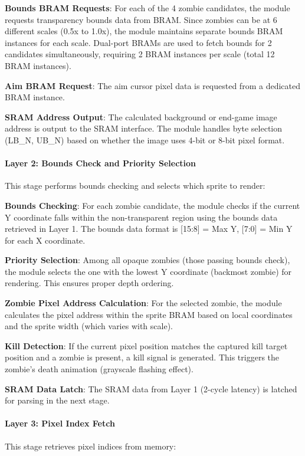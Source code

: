 \documentclass[12pt,a4paper]{article}
\begin{document}
\textbf{Bounds BRAM Requests}: For each of the 4 zombie candidates, the module requests transparency bounds data from BRAM. Since zombies can be at 6 different scales (0.5x to 1.0x), the module maintains separate bounds BRAM instances for each scale. Dual-port BRAMs are used to fetch bounds for 2 candidates simultaneously, requiring 2 BRAM instances per scale (total 12 BRAM instances).

\textbf{Aim BRAM Request}: The aim cursor pixel data is requested from a dedicated BRAM instance.

\textbf{SRAM Address Output}: The calculated background or end-game image address is output to the SRAM interface. The module handles byte selection (LB\_N, UB\_N) based on whether the image uses 4-bit or 8-bit pixel format.

\paragraph{Layer 2: Bounds Check and Priority Selection}
This stage performs bounds checking and selects which sprite to render:

\textbf{Bounds Checking}: For each zombie candidate, the module checks if the current Y coordinate falls within the non-transparent region using the bounds data retrieved in Layer 1. The bounds data format is [15:8] = Max Y, [7:0] = Min Y for each X coordinate.

\textbf{Priority Selection}: Among all opaque zombies (those passing bounds check), the module selects the one with the lowest Y coordinate (backmost zombie) for rendering. This ensures proper depth ordering.

\textbf{Zombie Pixel Address Calculation}: For the selected zombie, the module calculates the pixel address within the sprite BRAM based on local coordinates and the sprite width (which varies with scale).

\textbf{Kill Detection}: If the current pixel position matches the captured kill target position and a zombie is present, a kill signal is generated. This triggers the zombie's death animation (grayscale flashing effect).

\textbf{SRAM Data Latch}: The SRAM data from Layer 1 (2-cycle latency) is latched for parsing in the next stage.

\paragraph{Layer 3: Pixel Index Fetch}
This stage retrieves pixel indices from memory:
\end{document}
